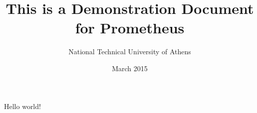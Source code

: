 \documentclass{article}
\title{This is a Demonstration Document for Prometheus}
\author{National Technical University of Athens}
\date{March 2015}
\begin{document}
   \maketitle
   Hello world!
\end{document}
